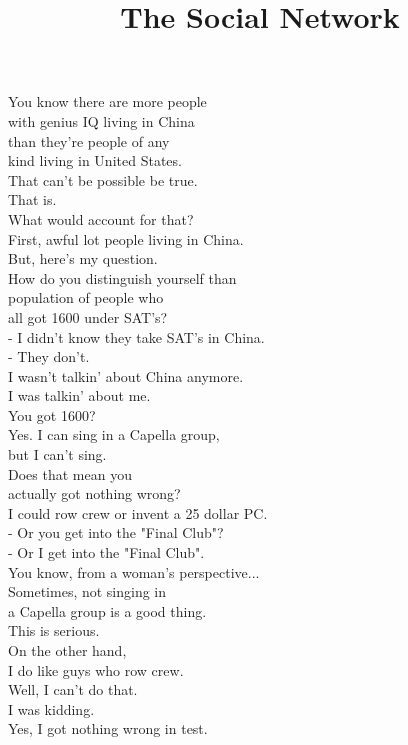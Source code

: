 \documentclass{article}
\date{}
\begin{document}
\title{The Social Network}
\maketitle
\columnseprule=0.2pt
\begin{multicols}{3}
\noindent
You know there are more people\\
with genius IQ living in China\\
than they're people of any\\
kind living in United States.\\
That can't be possible be true.\\
That is.\\
What would account for that?\\
First, awful lot people living in China.\\
But, here's my question.\\
How do you distinguish yourself than\\
population of people who\\
all got 1600 under SAT's?\\
- I didn't know they take SAT's in China.\\
- They don't.\\
I wasn't talkin' about China anymore.\\
I was talkin' about me.\\
You got 1600?\\
Yes. I can sing in a Capella group,\\
but I can't sing.\\
Does that mean you\\
actually got nothing wrong?\\
I could row crew or invent a 25 dollar PC.\\
- Or you get into the "Final Club"?\\
- Or I get into the "Final Club".\\
You know, from a woman's perspective...\\
Sometimes, not singing in\\
a Capella group is a good thing.\\
This is serious.\\
On the other hand,\\
I do like guys who row crew.\\
Well, I can't do that.\\
I was kidding.\\
Yes, I got nothing wrong in test.\\

\end{multicols}
\end{document}
